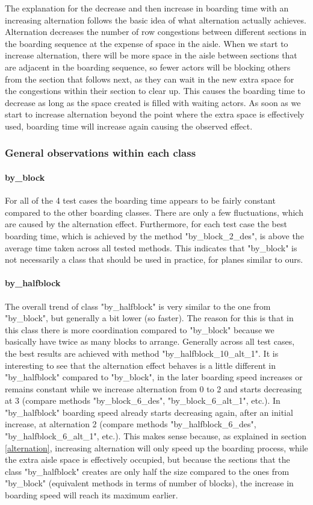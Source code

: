 \documentclass[11pt]{article}
\begin{document}
 The explanation for the decrease and then increase in boarding time with an increasing alternation follows the basic idea of what alternation actually achieves. Alternation decreases the number of row congestions between different sections in the boarding sequence at the expense of space in the aisle. When we start to increase alternation, there will be more space in the aisle between sections that are adjacent in the boarding sequence, so fewer actors will be blocking others from the section that follows next, as they can wait in the new extra space for the congestions within their section to clear up. 
 This causes the boarding time to decrease as long as the space created is filled with waiting actors. As soon as we start to increase alternation beyond the point where the extra space is effectively used, boarding time will increase again causing the observed effect.
 
  \subsubsection{General observations within each class}
 \paragraph{by\_block}
 For all of the 4 test cases the boarding time appears to be fairly constant compared to the other boarding classes. There are only a few fluctuations, which are caused by the alternation effect. Furthermore, for each test case the best boarding time, which is achieved by the method "by\_block\_2\_des", is above the average time taken across all tested methods. This indicates that "by\_block" is not necessarily a class that should be used in practice, for planes similar to ours. 
 \paragraph{by\_halfblock}
 The overall trend of class "by\_halfblock" is very similar to the one from "by\_block", but generally a bit lower (so faster). The reason for this is that in this class there is more coordination compared to "by\_block" because we basically have twice as many blocks to arrange. Generally across all test cases, the best results are achieved with method "by\_halfblock\_10\_alt\_1". It is interesting to see that the alternation effect behaves is a little different in "by\_halfblock" compared to "by\_block", in the later boarding speed increases or remains constant while we increase alternation from 0 to 2 and starts decreasing at 3 (compare methods "by\_block\_6\_des", "by\_block\_6\_alt\_1", etc.). In "by\_halfblock" boarding speed already starts decreasing again, after an initial increase, at alternation 2 (compare methods "by\_halfblock\_6\_des", "by\_halfblock\_6\_alt\_1", etc.). This makes sense because, as explained in section \ref{alternation}, increasing alternation will only speed up the boarding process, while the extra aisle space is effectively occupied, but because the sections that the class "by\_halfblock" creates are only half the size compared to the ones from "by\_block" (equivalent methods in terms of number of blocks), the increase in boarding speed will reach its maximum earlier. 
\end{document}

